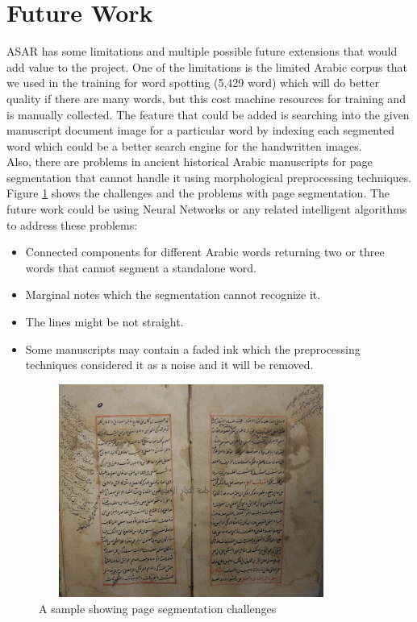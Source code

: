 \section{Future Work}
ASAR has some limitations and multiple possible future extensions that would add value to the project. One of the limitations is the limited Arabic corpus that we used in the training for word spotting (5,429 word) which will do better quality if there are many words, but this cost machine resources for training and is manually collected. The feature that could be added is searching into the given manuscript document image for a particular word by indexing each segmented word which could be a better search engine for the handwritten images. \\

\clearpage
Also, there are problems in ancient historical Arabic manuscripts for page segmentation that cannot handle it using morphological preprocessing techniques. Figure \ref{fig:page-chanllenges} shows the challenges and the problems with page segmentation. The future work could be using Neural Networks or any related intelligent algorithms to address these problems:

\begin{itemize}[itemsep=1pt, topsep=5pt]
    \item Connected components for different Arabic words returning two or three words that cannot segment a standalone word.
    \item Marginal notes which the segmentation cannot recognize it.
    \item The lines might be not straight. 
    \item Some manuscripts may contain a faded ink which the preprocessing techniques considered it as a noise and it will be removed.
\end{itemize}

\begin{figure}[!htb]
    \centering
    \includegraphics[width=10cm,height=7cm]{images/page-seg-challenges.png}
    \caption{A sample showing page segmentation challenges}
    \label{fig:page-chanllenges}
\end{figure}

\newpage

\printbibliography
